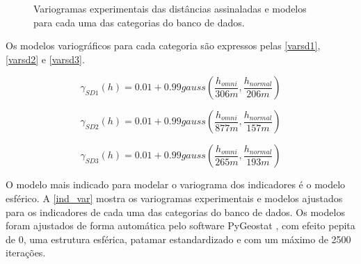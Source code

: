 \begin{figure}[H] 
\caption{Variogramas experimentais das distâncias assinaladas e modelos para cada uma das categorias do banco de dados.} \label{sd_var}
     \centering
\end{figure}

Os modelos variográficos para cada categoria são expressos pelas \autoref{varsd1}, \autoref{varsd2} e \autoref{varsd3}.

\begin{equation}
\label{varsd1}
\gamma_{SD1}(h)=0.01+0.99gauss\left(\frac{h_{omni}}{306m}, \frac{h_{normal}}{206m}\right)
\end{equation}

\begin{equation}
\label{varsd2}
\gamma_{SD2}(h)=0.01+0.99gauss\left(\frac{h_{omni}}{877m}, \frac{h_{normal}}{157m}\right)
\end{equation}

\begin{equation}
\label{varsd3}
\gamma_{SD3}(h)=0.01+0.99gauss\left(\frac{h_{omni}}{265m}, \frac{h_{normal}}{193m}\right)
\end{equation}

O modelo mais indicado para modelar o variograma dos indicadores é o modelo esférico. A \autoref{ind_var} mostra os variogramas experimentais e modelos ajustados para os indicadores de cada uma das categorias do banco de dados. Os modelos foram ajustados de forma automática pelo software PyGeostat \cite{pygeostat}, com efeito pepita de 0, uma estrutura esférica, patamar estandardizado e com um máximo de 2500 iterações.

